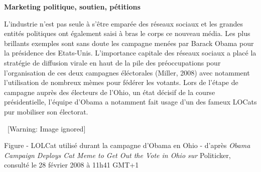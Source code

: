 \textbf{Marketing politique, soutien, p\'etitions}

L{\textquoteright}industrie n{\textquoteright}est pas seule \`a
s{\textquoteright}\^etre empar\'ee des r\'eseaux sociaux et les grandes
entit\'es politiques ont \'egalement saisi \`a bras le corps ce nouveau
m\'edia. Les plus brillants exemples sont sans doute les campagne
men\'ees par Barack Obama pour la pr\'esidence des Etats-Unis.
L{\textquoteright}importance capitale des r\'eseaux sociaux a plac\'e
la strat\'egie de diffusion virale en haut de la pile des
pr\'eoccupations pour l{\textquoteright}organisation de ces deux
campagnes \'el\'ectorales (Miller, 2008) avec notamment
l{\textquoteright}utilisation de nombreux m\`emes pour f\'ed\'erer les
votants. Lors de l{\textquoteright}\'etape de campagne aupr\`es des
\'electeurs de l{\textquoteright}Ohio, un \'etat d\'ecisif de la course
pr\'esidentielle, l{\textquoteright}\'equipe d{\textquoteright}Obama a
notamment fait usage d{\textquoteright}un des fameux LOCats pur
mobiliser son \'electorat.

{\centering{}\color{black}
\   [Warning: Image ignored] %
 
\par

Figure - LOLCat utilis\'e durant la campagne d{\textquoteright}Obama en
Ohio - d{\textquoteright}apr\`es \textit{Obama Campaign Deploys Cat
Meme to Get Out the Vote in Ohio sur }Politicker, consult\'e le 28
f\'evrier 2008 \`a 11h41 GMT+1}


